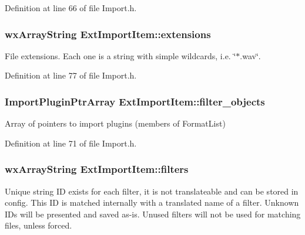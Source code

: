 Definition at line 66 of file Import.\+h.

\subsubsection[{\texorpdfstring{extensions}{extensions}}]{\setlength{\rightskip}{0pt plus 5cm}wx\+Array\+String Ext\+Import\+Item\+::extensions}\hypertarget{class_ext_import_item_a37b6ef945bf38279d156096de2745900}{}\label{class_ext_import_item_a37b6ef945bf38279d156096de2745900}
File extensions. Each one is a string with simple wildcards, i.\+e. \char`\"{}$\ast$.\+wav\char`\"{}. 

Definition at line 77 of file Import.\+h.

\subsubsection[{\texorpdfstring{filter\+\_\+objects}{filter_objects}}]{\setlength{\rightskip}{0pt plus 5cm}Import\+Plugin\+Ptr\+Array Ext\+Import\+Item\+::filter\+\_\+objects}\hypertarget{class_ext_import_item_a2bbd78eb3a5159fca03d7e1eeda638a8}{}\label{class_ext_import_item_a2bbd78eb3a5159fca03d7e1eeda638a8}
Array of pointers to import plugins (members of Format\+List) 

Definition at line 71 of file Import.\+h.

\subsubsection[{\texorpdfstring{filters}{filters}}]{\setlength{\rightskip}{0pt plus 5cm}wx\+Array\+String Ext\+Import\+Item\+::filters}\hypertarget{class_ext_import_item_a15fca71418912718ea7073cff0aa8d00}{}\label{class_ext_import_item_a15fca71418912718ea7073cff0aa8d00}
Unique string ID exists for each filter, it is not translateable and can be stored in config. This ID is matched internally with a translated name of a filter. Unknown I\+Ds will be presented and saved as-\/is. Unused filters will not be used for matching files, unless forced. 

